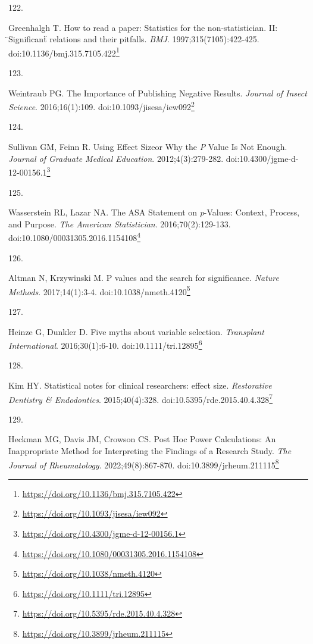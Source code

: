 \documentclass[
  a4paper,
]{book}
\newlength{\cslhangindent}
\newlength{\csllabelwidth}
\newlength{\cslentryspacingunit} %
\newenvironment{CSLReferences}[2] %
 {%
  \setlength{\parindent}{0pt}
  \ifodd #1
  \let\oldpar\par
  \def\par{\hangindent=\cslhangindent\oldpar}
  \fi
  \setlength{\parskip}{#2\cslentryspacingunit}
 }%
 {}
\newcommand{\CSLLeftMargin}[1]{\parbox[t]{\csllabelwidth}{#1}}
\newcommand{\CSLRightInline}[1]{\parbox[t]{\linewidth - \csllabelwidth}{#1}\break}
\renewcommand{\href}[2]{#2\footnote{\url{#1}}}
\begin{document}
\begin{CSLReferences}{0}{0}
\leavevmode{}%
\CSLLeftMargin{122. }%
\CSLRightInline{Greenhalgh T. How to read a paper: Statistics for the non-statistician. II: {̈}Significant{̈} relations and their pitfalls. \emph{BMJ}. 1997;315(7105):422-425. doi:\href{https://doi.org/10.1136/bmj.315.7105.422}{10.1136/bmj.315.7105.422}}

\leavevmode{}%
\CSLLeftMargin{123. }%
\CSLRightInline{Weintraub PG. The Importance of Publishing Negative Results. \emph{Journal of Insect Science}. 2016;16(1):109. doi:\href{https://doi.org/10.1093/jisesa/iew092}{10.1093/jisesa/iew092}}

\leavevmode{}%
\CSLLeftMargin{124. }%
\CSLRightInline{Sullivan GM, Feinn R. Using Effect Size{\textemdash}or Why the {\emph{P}} Value Is Not Enough. \emph{Journal of Graduate Medical Education}. 2012;4(3):279-282. doi:\href{https://doi.org/10.4300/jgme-d-12-00156.1}{10.4300/jgme-d-12-00156.1}}

\leavevmode{}%
\CSLLeftMargin{125. }%
\CSLRightInline{Wasserstein RL, Lazar NA. The ASA Statement on {\emph{p}}-Values: Context, Process, and Purpose. \emph{The American Statistician}. 2016;70(2):129-133. doi:\href{https://doi.org/10.1080/00031305.2016.1154108}{10.1080/00031305.2016.1154108}}

\leavevmode{}%
\CSLLeftMargin{126. }%
\CSLRightInline{Altman N, Krzywinski M. P values and the search for significance. \emph{Nature Methods}. 2017;14(1):3-4. doi:\href{https://doi.org/10.1038/nmeth.4120}{10.1038/nmeth.4120}}

\leavevmode{}%
\CSLLeftMargin{127. }%
\CSLRightInline{Heinze G, Dunkler D. Five myths about variable selection. \emph{Transplant International}. 2016;30(1):6-10. doi:\href{https://doi.org/10.1111/tri.12895}{10.1111/tri.12895}}

\leavevmode{}%
\CSLLeftMargin{128. }%
\CSLRightInline{Kim HY. Statistical notes for clinical researchers: effect size. \emph{Restorative Dentistry \& Endodontics}. 2015;40(4):328. doi:\href{https://doi.org/10.5395/rde.2015.40.4.328}{10.5395/rde.2015.40.4.328}}

\leavevmode{}%
\CSLLeftMargin{129. }%
\CSLRightInline{Heckman MG, Davis JM, Crowson CS. Post Hoc Power Calculations: An Inappropriate Method for Interpreting the Findings of a Research Study. \emph{The Journal of Rheumatology}. 2022;49(8):867-870. doi:\href{https://doi.org/10.3899/jrheum.211115}{10.3899/jrheum.211115}}


\end{CSLReferences}
\end{document}

